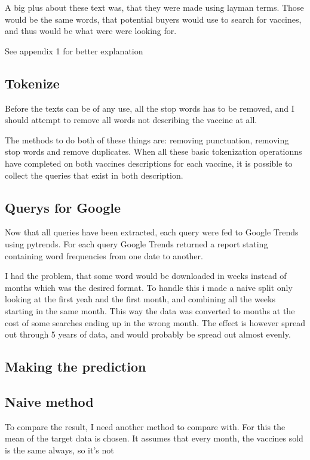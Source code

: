 \documentclass{sig-alternate}
\begin{document}
A big plus about these text was, that they were made using layman terms. Those would be the same words, that potential buyers would use to search for vaccines, and thus would be what were were looking for.

See appendix 1 for better explanation
\subsection*{Tokenize}
Before the texts can be of any use, all the stop words has to be removed, and I should attempt to remove all words not describing the vaccine at all. 

The methods to do both of these things are: removing punctuation, removing stop words and remove duplicates. When all these basic tokenization operationns have completed on both vaccines descriptions for each vaccine, it is possible to collect the queries that exist in both description.

\subsection*{Querys for Google}
Now that all queries have been extracted, each query were fed to Google Trends\cite{trends} using pytrends\cite{pytrends}. For each query Google Trends returned a report stating containing word frequencies from one date to another.


I had the problem, that some word would be downloaded in weeks instead of months which was the desired format. To handle this i made a naive split only looking at the first yeah and the first month, and combining all the weeks starting in the same month. This way the data was converted to months at the cost of some searches ending up in the wrong month. The effect is however spread out through 5 years of data, and would probably be spread out almost evenly.

\subsection*{Making the prediction}





\subsection{Naive method}To compare the result, I need another method to compare with. For this the mean of the target data is chosen. It assumes that every month, the vaccines sold is the same always, so it's not 
\end{document}
